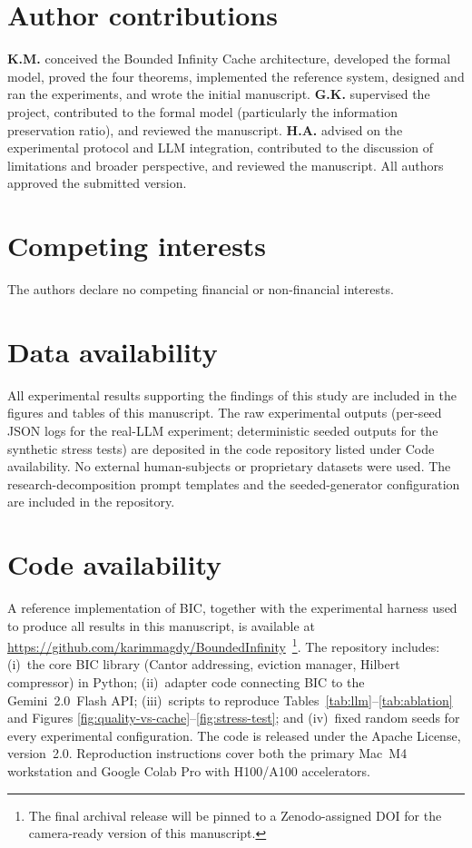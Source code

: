 \documentclass[fleqn,10pt]{article}
\theoremstyle{definition}
\begin{document}
\section*{Author contributions}

\textbf{K.M.} conceived the Bounded Infinity Cache architecture,
developed the formal model, proved the four theorems, implemented
the reference system, designed and ran the experiments, and wrote
the initial manuscript. \textbf{G.K.} supervised the project,
contributed to the formal model (particularly the information
preservation ratio), and reviewed the manuscript.
\textbf{H.A.} advised on the experimental protocol and LLM
integration, contributed to the discussion of limitations and
broader perspective, and reviewed the manuscript. All authors
approved the submitted version.

\section*{Competing interests}

The authors declare no competing financial or non-financial
interests.

\section*{Data availability}

All experimental results supporting the findings of this study are
included in the figures and tables of this manuscript. The raw
experimental outputs (per-seed JSON logs for the real-LLM
experiment; deterministic seeded outputs for the synthetic stress
tests) are deposited in the code repository listed under Code
availability. No external human-subjects or proprietary datasets
were used. The research-decomposition prompt templates and the
seeded-generator configuration are included in the repository.

\section*{Code availability}

A reference implementation of BIC, together with the experimental
harness used to produce all results in this manuscript, is available
at
\url{https://github.com/karimmagdy/BoundedInfinity}\,%
\footnote{The final archival release will be pinned to a
Zenodo-assigned DOI for the camera-ready version of this manuscript.}. The repository includes:
(i)~the core BIC library (Cantor addressing, eviction manager,
Hilbert compressor) in Python; (ii)~adapter code connecting BIC to
the Gemini~2.0~Flash API; (iii)~scripts to reproduce
Tables~\ref{tab:llm}--\ref{tab:ablation} and Figures
\ref{fig:quality-vs-cache}--\ref{fig:stress-test}; and
(iv)~fixed random seeds for every experimental configuration. The
code is released under the Apache License, version~2.0.
Reproduction instructions cover both the primary Mac~M4 workstation
and Google Colab Pro with H100/A100 accelerators.
\end{document}
